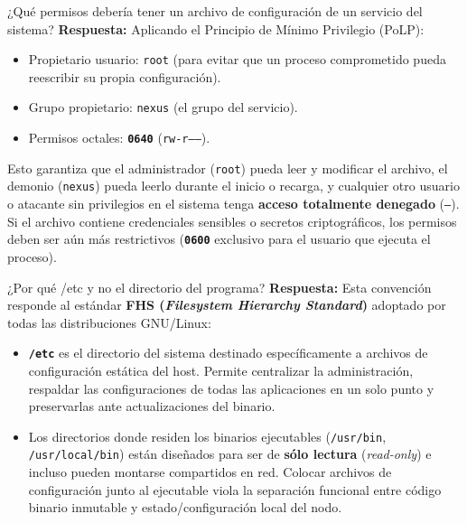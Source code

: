 \documentclass[10pt,a4paper]{article}
\begin{document}
\begin{pregunta}{¿Qué permisos debería tener un archivo de configuración de un servicio del sistema?}
    \textbf{Respuesta:} Aplicando el Principio de Mínimo Privilegio (PoLP):
    \begin{itemize}[leftmargin=*]
        \item Propietario usuario: \texttt{root} (para evitar que un proceso comprometido pueda reescribir su propia configuración).
        \item Grupo propietario: \texttt{nexus} (el grupo del servicio).
        \item Permisos octales: \textbf{\texttt{0640}} (\texttt{rw-r-----}).
    \end{itemize}
    Esto garantiza que el administrador (\texttt{root}) pueda leer y modificar el archivo, el demonio (\texttt{nexus}) pueda leerlo durante el inicio o recarga, y cualquier otro usuario o atacante sin privilegios en el sistema tenga \textbf{acceso totalmente denegado} (\texttt{---}). Si el archivo contiene credenciales sensibles o secretos criptográficos, los permisos deben ser aún más restrictivos (\textbf{\texttt{0600}} exclusivo para el usuario que ejecuta el proceso).
\end{pregunta}

\begin{pregunta}{¿Por qué /etc y no el directorio del programa?}
    \textbf{Respuesta:} Esta convención responde al estándar \textbf{FHS (\textit{Filesystem Hierarchy Standard})} adoptado por todas las distribuciones GNU/Linux:
    \begin{itemize}[leftmargin=*]
        \item \textbf{\texttt{/etc}} es el directorio del sistema destinado específicamente a archivos de configuración estática del host. Permite centralizar la administración, respaldar las configuraciones de todas las aplicaciones en un solo punto y preservarlas ante actualizaciones del binario.
        \item Los directorios donde residen los binarios ejecutables (\texttt{/usr/bin}, \texttt{/usr/local/bin}) están diseñados para ser de \textbf{sólo lectura} (\textit{read-only}) e incluso pueden montarse compartidos en red. Colocar archivos de configuración junto al ejecutable viola la separación funcional entre código binario inmutable y estado/configuración local del nodo.
    \end{itemize}
\end{pregunta}
\end{document}
